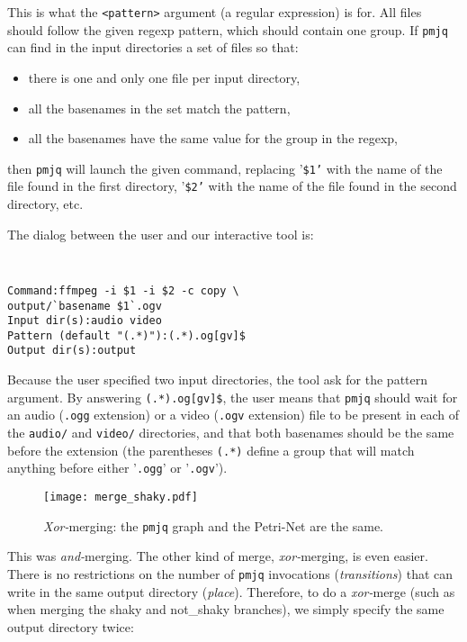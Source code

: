 \documentclass[letterpaper,twocolumn,10pt]{article}
\begin{document}
This is what the {\tt <pattern>} argument (a regular expression) is for. All files should follow the given regexp pattern, which should contain one group. If {\tt pmjq} can find in the input directories a set of files so that:
\begin{itemize}
\item there is one and only one file per input directory,
\item all the basenames in the set match the pattern,
\item all the basenames have the same value for the group in the regexp,
\end{itemize}
then {\tt pmjq} will launch the given command, replacing {'\tt \$1'} with the name of the file found in the first directory, {'\tt \$2'} with the name of the file found in the second directory, etc.

The dialog between the user and our interactive tool is:
{\tt \small
\begin{verbatim}
Command:ffmpeg -i $1 -i $2 -c copy \
output/`basename $1`.ogv
Input dir(s):audio video
Pattern (default "(.*)"):(.*).og[gv]$
Output dir(s):output
\end{verbatim}
}

Because the user specified two input directories, the tool ask for the pattern argument. By answering {\tt (.*).og[gv]\$}, the user means that {\tt pmjq} should wait for an audio ({\tt .ogg} extension) or a video ({\tt .ogv} extension) file to be present in each of the {\tt audio/} and {\tt video/} directories, and that both basenames should be the same before the extension (the parentheses {\tt (.*)} define a group that will match anything before either '{\tt .ogg}' or '{\tt .ogv}').

\begin{figure}[t]
\begin{center}
\texttt{[image: merge\_shaky.pdf]}
\end{center}
\caption{\emph{Xor-}merging: the {\tt pmjq} graph and the Petri-Net are the same.}
\label{fig:merge_shaky}
\end{figure}

This was \emph{and-}merging. The other kind of merge, \emph{xor-}merging, is even easier. There is no restrictions on the number of {\tt pmjq} invocations (\emph{transitions}) that can write in the same output directory (\emph{place}). Therefore, to do a \emph{xor-}merge (such as when merging the shaky and not\_shaky branches), we simply specify the same output directory twice:
\end{document}
